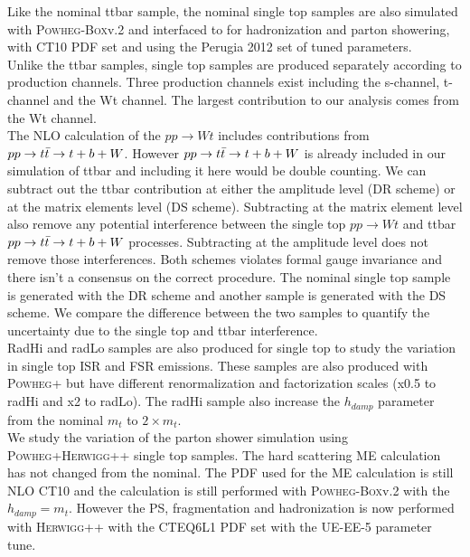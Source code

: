 \indent Like the nominal ttbar sample, the nominal single top samples are also simulated with \textsc{Powheg-Box}v.2\cite{PowhegST_st,PowhegST_wt}  and interfaced to  for hadronization and parton showering, with CT10 PDF set and using the Perugia 2012 set of tuned parameters. \\

\indent Unlike the ttbar samples, single top samples are produced separately according to production channels.  Three production channels exist including the s-channel, t-channel and the Wt channel.  The largest contribution to our analysis comes from the Wt channel.  \\

\indent The NLO calculation of the $pp \rightarrow Wt$ includes contributions from $ pp \rightarrow t\bar{t} \rightarrow t + b + W$.  However $ pp \rightarrow t\bar{t} \rightarrow t + b + W$ is already included in our simulation of ttbar and including it here would be double counting.  We can subtract out the ttbar contribution at either the amplitude level (DR scheme) or at the matrix elements level (DS scheme).  Subtracting at the matrix element level also remove any potential interference between the single top $pp \rightarrow Wt$ and ttbar $ pp \rightarrow t\bar{t} \rightarrow t + b + W$ processes.  Subtracting at the amplitude level does not remove those interferences.  Both schemes violates formal gauge invariance and there isn't a consensus on the correct procedure.  The nominal single top sample is generated with the DR scheme and another sample is generated with the DS scheme.  We compare the difference between the two samples to quantify the uncertainty due to the single top and ttbar interference. \\

\indent RadHi and radLo samples are also produced for single top to study the variation in single top ISR and FSR emissions.  These samples are also produced with \textsc{Powheg+} but have different renormalization and factorization scales (x0.5 to radHi and x2 to radLo). The radHi sample also increase the $h_{damp}$ parameter from the nominal $m_{t}$ to $2 \times m_{t}$. \\

\indent We study the variation of the parton shower simulation using \textsc{Powheg+Herwigg++} single top samples.  The hard scattering ME calculation has not changed from the nominal.  The PDF used for the ME calculation is still NLO CT10 and the calculation is still performed with \textsc{Powheg-Box}v.2 with the $h_{damp} = m_{t}$.  However the PS, fragmentation and hadronization is now performed with \textsc{Herwigg++} with the CTEQ6L1 PDF set \cite{CTEQ6L1} with the UE-EE-5 parameter tune. \\

